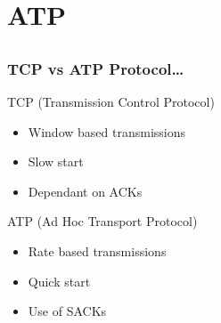 \section{ATP}
\subsection*{}

\begin{frame}[t]
  \frametitle{TCP vs ATP Protocol\dots}

  TCP (Transmission Control Protocol)
  \begin{itemize}
  \item Window based transmissions
  \item Slow start
  \item Dependant on ACKs
  \end{itemize}

  \vfill

  ATP (Ad Hoc Transport Protocol)
  \begin{itemize}
  \item Rate based transmissions
  \item Quick start
  \item Use of SACKs
  \end{itemize}

  \vfill

  \begin{flushleft}
    \begin{tiny}
      \begin{minipage}{1.0\linewidth}
      \end{minipage}
    \end{tiny}
  \end{flushleft}
  
\end{frame}

